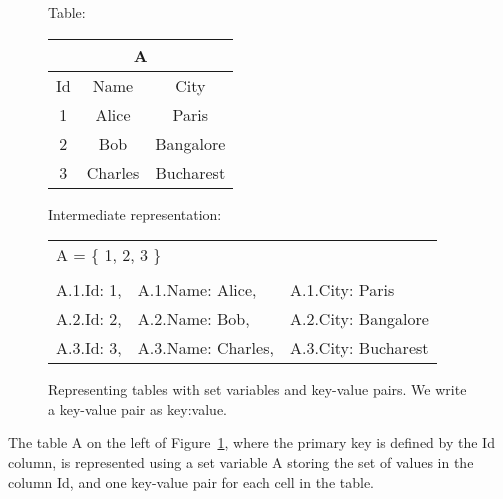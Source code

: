 \begin{figure}[t]
{\footnotesize
\begin{minipage}[t]{3cm}
\setlength{\tabcolsep}{3pt}
\begin{center}
Table:
\end{center}

\begin{tabular}{|c|c|c|} \hline
\multicolumn{3}{|c|}{A} \\ \hline\hline
Id & Name & City \\ \hline
1 & Alice & Paris \\ \hline
2 & Bob & Bangalore \\ \hline
3 & Charles & Bucharest \\ \hline
\end{tabular}
\end{minipage}
\begin{minipage}[t]{5cm}
\begin{center}
Intermediate representation:
\end{center}
\setlength{\tabcolsep}{1pt}
\begin{tabular}{lll} 
\multicolumn{3}{l}{A = \{ 1, 2, 3 \}} \\
\\[1mm]
A.1.Id: 1, & A.1.Name: Alice, & A.1.City: Paris \\
A.2.Id: 2, & A.2.Name: Bob, & A.2.City: Bangalore \\
A.3.Id: 3, & A.3.Name: Charles, & A.3.City: Bucharest
\end{tabular}
\end{minipage}}
 \vspace{-2mm}
\caption{Representing tables with set variables and key-value pairs. We write a key-value pair as key:value.}
\label{fig:sql-example}
 \vspace{-2mm}
\end{figure}

\begin{example}

The table A on the left of Figure~\ref{fig:sql-example}, where the primary key is defined by the Id column, is represented using a set variable A storing the set of values in the column Id, and one key-value pair for each cell in the table.

\end{example}

